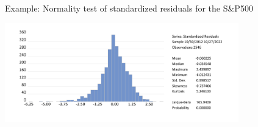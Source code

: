 \begin{frame}%

\begin{block}{Example: Normality test of standardized residuals for the S\&P500}
\centerline{\includegraphics[height=1.7in]{hist_resids}}
\end{block}

\end{frame}%


